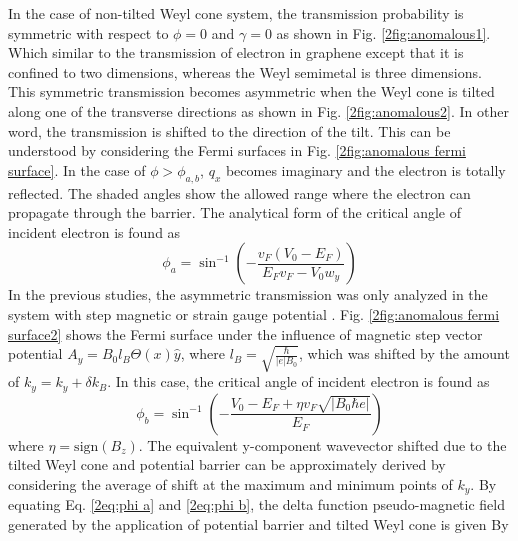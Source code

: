     In the case of non-tilted Weyl cone system, the transmission probability is symmetric with respect to $\phi = 0$ and $\gamma = 0$ as shown in Fig. \ref{2fig:anomalous1}.
    Which similar to the transmission of electron in graphene except that it is confined to two dimensions, whereas the Weyl semimetal is three dimensions.
    This symmetric transmission becomes asymmetric when the Weyl cone is tilted along one of the transverse directions as shown in Fig. \ref{2fig:anomalous2}.
    In other word, the transmission is shifted to the direction of the tilt. 
    This can be understood by considering the Fermi surfaces in Fig. \ref{2fig:anomalous fermi surface}.
    In the case of $\phi > \phi_{a,b}$, $q_x$ becomes imaginary and the electron is totally reflected.
    The shaded angles show the allowed range where the electron can propagate through the barrier.
    The analytical form of the critical angle of incident electron is found as
    \begin{equation} \label{2eq:phi a}
        \phi_a = \sin^{-1}{\left(- \frac{v_F (V_0 - E_F)}{E_F v_F - V_0 w_y}\right)}
    \end{equation}
    In the previous studies, the asymmetric transmission was only analyzed in the system with step magnetic or strain gauge potential \cite{Pereira2009,Fujita2010,Wu2010}.
    Fig. \ref{2fig:anomalous fermi surface2} shows the Fermi surface under the influence of magnetic step vector potential $A_y = B_0 l_B \Theta (x)\hat{y}$, where $l_B = \sqrt{\frac{\hbar}{|e|B_0}}$, 
    which was shifted by the amount of $k_y = k_y + \delta k_B$.
    In this case, the critical angle of incident electron is found as
    \begin{equation} \label{2eq:phi b}
        \phi_b = \sin^{-1}{\left(-\frac{V_0 - E_F + \eta v_F \sqrt{|B_0 \hbar e|}}{E_F}\right)}
    \end{equation}
    where $\eta = \mathrm{sign}(B_z)$. The equivalent y-component wavevector shifted due to the tilted Weyl cone and potential barrier can be approximately derived by considering the average of shift
    at the maximum and minimum points of $k_y$.
    By equating Eq. \ref{2eq:phi a} and \ref{2eq:phi b}, the delta function pseudo-magnetic field generated by the application of potential barrier and tilted Weyl cone is given By


